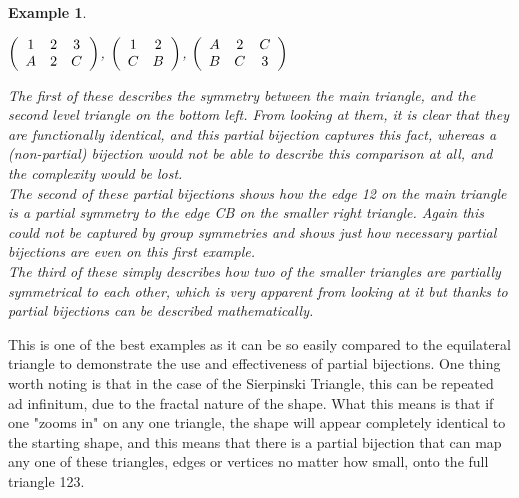 \documentclass[12pt]{article}
\newtheorem{ex}[theorem]{Example}
\begin{document}
\begin{ex}
\begin{center}
	$\left(
		\begin{array}{c c c}
		1 & 2 & 3\\
		A & 2 & C
		\end{array}
		\right)$,
	$\left(
		\begin{array}{c c}
		1 & 2 \\
		C & B 
		\end{array}
		\right)$,
	$\left(
		\begin{array}{c c c}
		A & 2 & C\\
		B & C & 3
		\end{array}
		\right)$
\end{center}
The first of these describes the symmetry between the main triangle, and the second level triangle on the bottom left. From looking at them, it is clear that they are functionally identical, and this partial bijection captures this fact, whereas a (non-partial) bijection would not be able to describe this comparison at all, and the complexity would be lost.\\
The second of these partial bijections shows how the edge 12 on the main triangle is a partial symmetry to the edge CB on the smaller right triangle. Again this could not be captured by group symmetries and shows just how necessary partial bijections are even on this first example.\\
The third of these simply describes how two of the smaller triangles are partially symmetrical to each other, which is very apparent from looking at it but thanks to partial bijections can be described mathematically.\\
\end{ex}
\noindent This is one of the best examples as it can be so easily compared to the equilateral triangle to demonstrate the use and effectiveness of partial bijections. One thing worth noting is that in the case of the Sierpinski Triangle, this can be repeated ad infinitum, due to the fractal nature of the shape. What this means is that if one "zooms in" on any one triangle, the shape will appear completely identical to the starting shape, and this means that there is a partial bijection that can map any one of these triangles, edges or vertices no matter how small, onto the full triangle 123.
\end{document}
